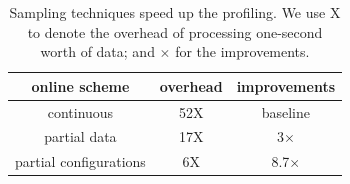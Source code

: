 
\begin{table}[t]
  \centering
  \begin{tabular}{c c c}
    \toprule
    online scheme & overhead & improvements \\
    \midrule
    continuous & 52X & baseline \\
    partial data & 17X & 3$\times$\\
    partial configurations & 6X & 8.7$\times$ \\
    \bottomrule
  \end{tabular}
  \caption{Sampling techniques speed up the profiling. We use X to denote the overhead of processing one-second worth of data; and $\times$ for the improvements.}
  \label{tab:online}
\end{table}


